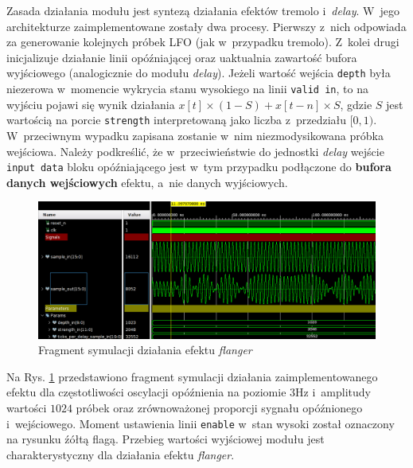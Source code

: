Zasada działania modułu jest syntezą działania efektów tremolo i~\textit{delay}. W~jego architekturze zaimplementowane zostały dwa procesy. Pierwszy z~nich odpowiada za generowanie kolejnych próbek LFO (jak w~przypadku tremolo). Z~kolei drugi inicjalizuje działanie linii opóźniającej oraz uaktualnia zawartość bufora wyjściowego (analogicznie do modułu \textit{delay}). Jeżeli wartość wejścia \verb|depth| była niezerowa w~momencie wykrycia stanu wysokiego na linii \verb|valid in|, to na wyjściu pojawi się wynik działania $x[t] \times (1 - S) + x[t-n] \times S$, gdzie $S$ jest wartością na porcie \verb|strength| interpretowaną jako liczba z~przedziału $[0,1)$. W~przeciwnym wypadku zapisana zostanie w~nim niezmodysikowana próbka wejściowa. Należy podkreślić, że w~przeciwieństwie do jednostki \textit{delay} wejście \verb|input data| bloku opóźniającego jest w~tym przypadku podłączone do \textbf{bufora danych wejściowych} efektu, a~nie danych wyjściowych. 

\vspace{1cm}
\begin{figure}[ht]
    \centering
    \includegraphics[width=\textwidth]{img/sim/flanger_sim.png}
    \captionsetup{format=plain,justification=centering}
    \caption{Fragment symulacji działania efektu \textit{flanger}}
    \label{sim-flanger}
\end{figure}
\vspace{0.5cm}

Na Rys. \ref{sim-flanger} przedstawiono fragment symulacji działania zaimplementowanego efektu dla częstotliwości oscylacji opóźnienia na poziomie $3$Hz i~amplitudy wartości $1024$ próbek oraz zrównoważonej proporcji sygnału opóźnionego i~wejściowego. Moment ustawienia linii \verb|enable| w~stan wysoki został oznaczony na rysunku źółtą flagą. Przebieg wartości wyjściowej modułu jest charakterystyczny dla działania efektu \textit{flanger}.

